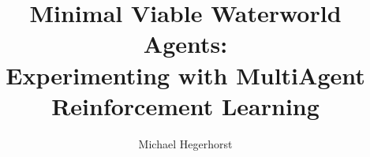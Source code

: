 \documentclass[conference, 12pt]{IEEEtran}
\begin{document}
%
    \title{
        Minimal Viable Waterworld Agents:\\
        Experimenting with MultiAgent Reinforcement Learning
    }
%
%
%

    \author{Michael Hegerhorst}

%
%


%


\end{document}
